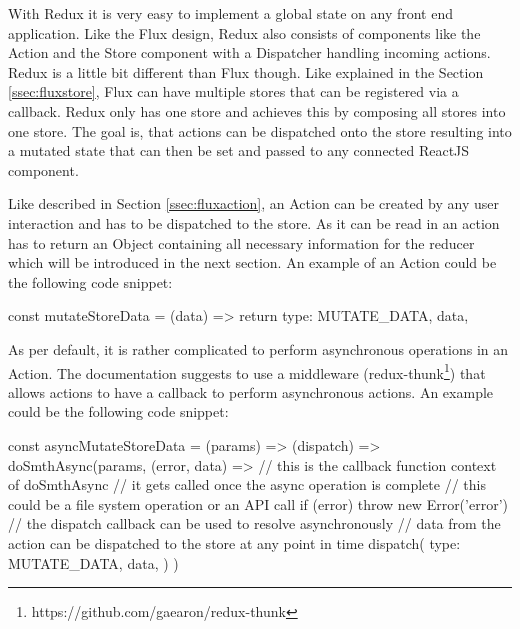 With Redux it is very easy to implement a global state on any front end application. Like the Flux design, Redux also consists of components like the Action and the Store component with a Dispatcher handling incoming actions. Redux is a little bit different than Flux though. Like explained in the Section \ref{ssec:fluxstore}, Flux can have multiple stores that can be registered via a callback. Redux only has one store and achieves this by composing all stores into one store. The goal is, that actions can be dispatched onto the store resulting into a mutated state that can then be set and passed to any connected ReactJS component.

Like described in Section \ref{ssec:fluxaction}, an Action can be created by any user interaction and has to be dispatched to the store. As it can be read in \cite[Actions]{DanAbramov.2015} an action has to return an Object containing all necessary information for the reducer which will be introduced in the next section. An example of an Action could be the following code snippet:

\begin{JsCode}
const mutateStoreData = (data) => {
  return {
    type: MUTATE_DATA,
    data,
  }
}
\end{JsCode}

As per default, it is rather complicated to perform asynchronous operations in an Action. The documentation \cite[Async Actions]{DanAbramov.2015} suggests to use a middleware (redux-thunk\footnote{https://github.com/gaearon/redux-thunk}) that allows actions to have a callback to perform asynchronous actions. An example could be the following code snippet:

\begin{JsCode}
const asyncMutateStoreData = (params) => (dispatch) => {
  doSmthAsync(params, (error, data) => {
  	// this is the callback function context of doSmthAsync 
    // it gets called once the async operation is complete
    // this could be a file system operation or an API call
    if (error) throw new Error('error')
    // the dispatch callback can be used to resolve asynchronously
    // data from the action can be dispatched to the store at any point in time
    dispatch({
      type: MUTATE_DATA,
      data,
    })
  })
}
\end{JsCode}

